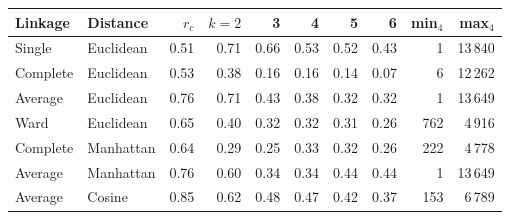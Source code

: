 \begin{tabular}{@{}llrrrrrrrr@{}}
\toprule
Linkage & Distance & $r_c$ & $k{=}2$ & 3 & 4 & 5 & 6 & min$_4$ & max$_4$ \\
\midrule
Single & Euclidean & 0.51 & 0.71 & 0.66 & 0.53 & 0.52 & 0.43 & 1 & 13\,840 \\
Complete & Euclidean & 0.53 & 0.38 & 0.16 & 0.16 & 0.14 & 0.07 & 6 & 12\,262 \\
Average & Euclidean & 0.76 & 0.71 & 0.43 & 0.38 & 0.32 & 0.32 & 1 & 13\,649 \\
Ward & Euclidean & 0.65 & 0.40 & 0.32 & 0.32 & 0.31 & 0.26 & 762 & 4\,916 \\
Complete & Manhattan & 0.64 & 0.29 & 0.25 & 0.33 & 0.32 & 0.26 & 222 & 4\,778 \\
Average & Manhattan & 0.76 & 0.60 & 0.34 & 0.34 & 0.44 & 0.44 & 1 & 13\,649 \\
Average & Cosine & 0.85 & 0.62 & 0.48 & 0.47 & 0.42 & 0.37 & 153 & 6\,789 \\
\bottomrule
\end{tabular}

